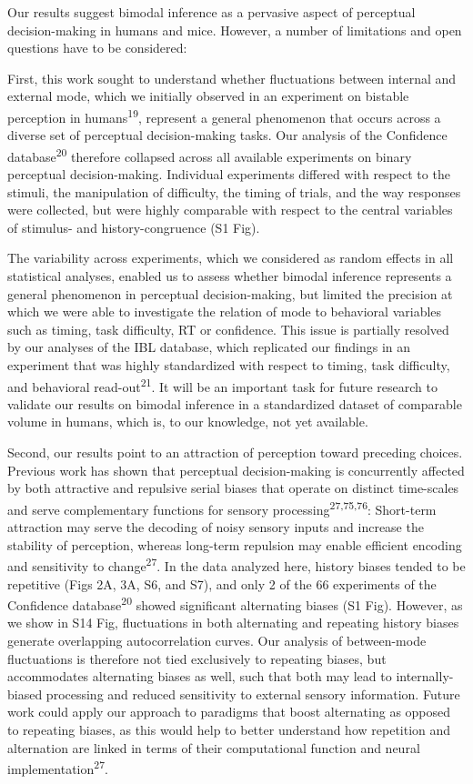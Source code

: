 \documentclass[
]{article}
\begin{document}
Our results suggest bimodal inference as a pervasive aspect of
perceptual decision-making in humans and mice. However, a number of
limitations and open questions have to be considered:

First, this work sought to understand whether fluctuations between
internal and external mode, which we initially observed in an experiment
on bistable perception in humans\textsuperscript{19}, represent a
general phenomenon that occurs across a diverse set of perceptual
decision-making tasks. Our analysis of the Confidence
database\textsuperscript{20} therefore collapsed across all available
experiments on binary perceptual decision-making. Individual experiments
differed with respect to the stimuli, the manipulation of difficulty,
the timing of trials, and the way responses were collected, but were
highly comparable with respect to the central variables of stimulus- and
history-congruence (S1 Fig).

The variability across experiments, which we considered as random
effects in all statistical analyses, enabled us to assess whether
bimodal inference represents a general phenomenon in perceptual
decision-making, but limited the precision at which we were able to
investigate the relation of mode to behavioral variables such as timing,
task difficulty, RT or confidence. This issue is partially resolved by
our analyses of the IBL database, which replicated our findings in an
experiment that was highly standardized with respect to timing, task
difficulty, and behavioral read-out\textsuperscript{21}. It will be an
important task for future research to validate our results on bimodal
inference in a standardized dataset of comparable volume in humans,
which is, to our knowledge, not yet available.

Second, our results point to an attraction of perception toward
preceding choices. Previous work has shown that perceptual
decision-making is concurrently affected by both attractive and
repulsive serial biases that operate on distinct time-scales and serve
complementary functions for sensory
processing\textsuperscript{27,75,76}: Short-term attraction may serve
the decoding of noisy sensory inputs and increase the stability of
perception, whereas long-term repulsion may enable efficient encoding
and sensitivity to change\textsuperscript{27}. In the data analyzed
here, history biases tended to be repetitive (Figs 2A, 3A,
S6, and S7), and only 2 of the 66 experiments of the
Confidence database\textsuperscript{20} showed significant alternating
biases (S1 Fig). However, as we show in S14
Fig, fluctuations in both alternating and repeating history
biases generate overlapping autocorrelation curves. Our analysis of
between-mode fluctuations is therefore not tied exclusively to repeating
biases, but accommodates alternating biases as well, such that both may
lead to internally-biased processing and reduced sensitivity to external
sensory information. Future work could apply our approach to paradigms
that boost alternating as opposed to repeating biases, as this would
help to better understand how repetition and alternation are linked in
terms of their computational function and neural
implementation\textsuperscript{27}.
\end{document}
